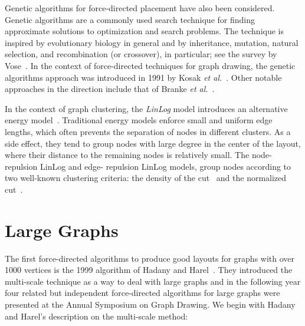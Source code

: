 \documentclass[notitlepage,letter,11pt]{article}
\begin{document}
Genetic algorithms for force-directed placement have also been
considered. Genetic algorithms are a commonly used search technique
for finding approximate solutions to optimization and search
problems. The technique is inspired by evolutionary biology in general
and by inheritance, mutation, natural selection, and recombination (or
crossover), in particular; see the survey by Vose~\cite{v-sga-99}.  In
the context of force-directed techniques for graph drawing, the
genetic algorithms approach was introduced in 1991 by Kosak {\em et al.}~\cite{kosak91}. Other notable approaches in the direction include that of Branke {\em et al.}~\cite{Branke97}.

In the context of graph clustering, the {\em LinLog} model introduces
an alternative energy model~\cite{Noack07}. Traditional energy models enforce small and uniform edge
lengths, which often prevents the separation of nodes in different
clusters. As a side effect, they tend to group nodes with large degree
in the center of the layout, where their
distance to the remaining nodes is relatively small. The node-repulsion LinLog and edge-
repulsion LinLog models, group nodes according to two
well-known clustering criteria: the density of the cut~\cite{lr-amf-88} and the normalized cut~\cite{sm-nc-00}. 

\section{Large Graphs}
\label{fd:sec:large}

The first force-directed algorithms to produce good layouts for graphs
with over 1000 vertices is the 1999 algorithm of Hadany and
Harel~\cite{hh-msadg-99}. They introduced the multi-scale technique as
a way to deal with large graphs and in the following year four related
but independent force-directed algorithms for large graphs were
presented at the Annual Symposium on Graph Drawing. We begin with
Hadany and Harel's description on the multi-scale method:
\end{document}
